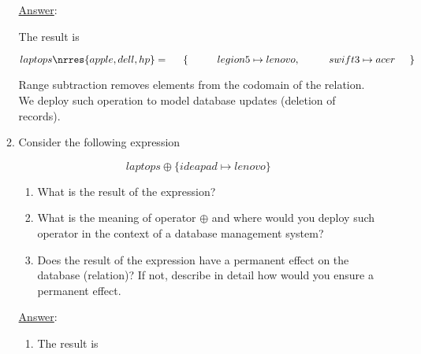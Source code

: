 \documentclass[12pt]{article}
\begin{document}
\begin{itemize}
\begin{enumerate}
                        \newpage

                        \noindent \underline{Answer}:


                        \noindent \noindent The result is

                        \[
                              laptops \nrres \{ apple, dell, hp \} = \\
                              \hspace{5mm} \{ \\
                              \hspace{10mm} legion5 \mapsto lenovo,\\
                              \hspace{10mm} swift3 \mapsto acer\\
                              \hspace{5mm} \}
                        \]


                        \noindent  Range subtraction removes elements from the codomain of the relation. We deploy such operation to model database updates (deletion of records). %



                  \item Consider the following expression

                        \[ laptops \oplus \{ ideapad \mapsto lenovo \} \]


                        \begin{enumerate}
                              \item What is the result of the expression?

                              \item What is the meaning of operator $\oplus$ and where would you deploy such operator in the context of a database management system?

                              \item Does the result of the expression have a permanent effect on the database (relation)? If not, describe in detail how would you ensure a permanent effect.

                        \end{enumerate}

                        \newpage

                        \noindent \underline{Answer}:


                        \begin{enumerate}
                              \item  The result is


\end{enumerate}
\end{enumerate}
\end{itemize}
\end{document}
